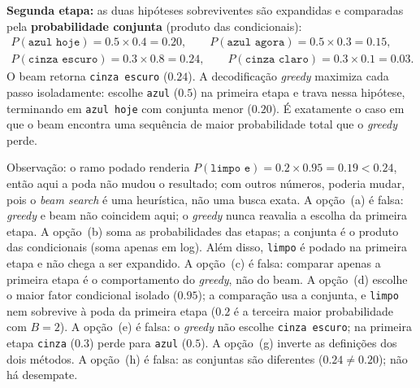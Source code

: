 \documentclass{dlproblemset}
\begin{document}
\textbf{Segunda etapa:} as duas hipóteses sobreviventes são expandidas e comparadas pela
\textbf{probabilidade conjunta} (produto das condicionais):
\begin{gather*}
P(\texttt{azul hoje}) = 0.5 \times 0.4 = 0.20,
\qquad
P(\texttt{azul agora}) = 0.5 \times 0.3 = 0.15,\\
P(\texttt{cinza escuro}) = 0.3 \times 0.8 = 0.24,
\qquad
P(\texttt{cinza claro}) = 0.3 \times 0.1 = 0.03.
\end{gather*}
O beam retorna \texttt{cinza escuro} ($0.24$). A decodificação \textit{greedy} maximiza
cada passo isoladamente: escolhe \texttt{azul} ($0.5$) na primeira etapa e trava nessa
hipótese, terminando em \texttt{azul hoje} com conjunta menor ($0.20$). É exatamente o
caso em que o beam encontra uma sequência de maior probabilidade total que o
\textit{greedy} perde.

Observação: o ramo podado renderia $P(\texttt{limpo e}) = 0.2 \times 0.95 = 0.19 < 0.24$,
então aqui a poda não mudou o resultado; com outros números, poderia mudar, pois o
\textit{beam search} é uma heurística, não uma busca exata.
A opção~(a) é falsa: \textit{greedy} e beam não coincidem aqui; o \textit{greedy} nunca
reavalia a escolha da primeira etapa.
A opção~(b) soma as probabilidades das etapas; a conjunta é o produto das condicionais
(soma apenas em log). Além disso, \texttt{limpo} é podado na primeira etapa e não chega
a ser expandido.
A opção~(c) é falsa: comparar apenas a primeira etapa é o comportamento do
\textit{greedy}, não do beam.
A opção~(d) escolhe o maior fator condicional isolado ($0.95$); a comparação usa a
conjunta, e \texttt{limpo} nem sobrevive à poda da primeira etapa ($0.2$ é a terceira
maior probabilidade com $B = 2$).
A opção~(e) é falsa: o \textit{greedy} não escolhe \texttt{cinza escuro}; na primeira
etapa \texttt{cinza} ($0.3$) perde para \texttt{azul} ($0.5$).
A opção~(g) inverte as definições dos dois métodos.
A opção~(h) é falsa: as conjuntas são diferentes ($0.24 \neq 0.20$); não há desempate.

\end{document}
